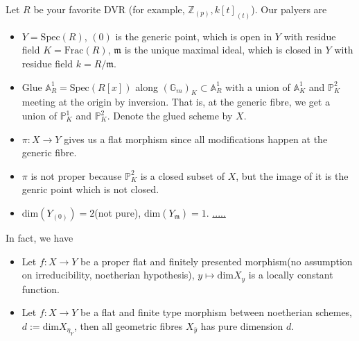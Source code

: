 \documentclass[../main.tex]{subfiles}
\begin{document}
\begin{example}
Let $R$ be your favorite DVR (for example, $\mathbb{Z}_{(p)}, k[t]_{(t)}$). Our palyers are 
\begin{itemize}
\item $Y=\mathrm{Spec}(R)$, $(0)$ is the generic point, which is open in $Y$ with residue field $K=\mathrm{Frac}(R)$, $\mathfrak{m}$ is the unique maximal ideal, which is closed in $Y$ with residue field $k=R/\mathfrak{m}$.
\item Glue $\mathbb{A}_{R}^{1}=\mathrm{Spec}(R[x])$ along $(\mathbb{G}_{m})_{K}\subset \mathbb{A}_{R}^{1}$ with a union of $\mathbb{A}_{K}^{1}$ and $\mathbb{P}_{K}^{2}$ meeting at the origin by inversion. That is, at the generic fibre, we get a union of $\mathbb{P}_{K}^{1}$ and $\mathbb{P}_{K}^{2}$. Denote the glued scheme by $X$. 
\item $\pi:X\rightarrow Y$ gives us a flat morphism since all modifications happen at the generic fibre. 
\item $\pi$ is not proper because $\mathbb{P}_{K}^{2}$ is a closed subset of $X$, but the image of it is the genric point which is not closed. 
\item $\mathrm{dim}(Y_{(0)})=2$(not pure), $\mathrm{dim}(Y_{\mathfrak{m}})=1$. 
\href{https://mathoverflow.net/questions/7469/is-relatively-algebraically-closed-stable-under-finite-field-extensions}{.....}
\end{itemize}



\end{example}
\begin{remark}
In fact, we have 
\begin{itemize}
\item Let $f:X\rightarrow Y$ be a proper flat and finitely presented morphism(no assumption on irreducibility, noetherian hypothesis), $y\mapsto \mathrm{dim}X_{y}$ is a locally constant function.
\item Let $f:X\rightarrow Y$ be a flat and finite type morphism between noetherian schemes, $d:=\mathrm{dim}X_{\eta_{Y}}$, then all geometric fibres $X_{\bar{y}}$ has pure dimension $d$.
\end{itemize}


\end{remark}
\end{document}
